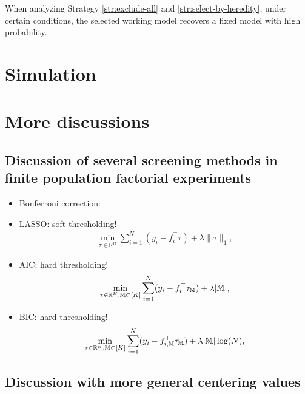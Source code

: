 \documentclass[12pt]{article}
\begin{document}
When analyzing Strategy \ref{str:exclude-all} and \ref{str:select-by-heredity}, under certain conditions, the selected working model recovers a fixed model with high probability. 


\section{Simulation}

\section{More discussions}

\subsection{Discussion of several  screening methods in finite population factorial experiments}
\begin{itemize}
\item Bonferroni correction:

\item LASSO: {\color{red} soft thresholding!}
\begin{align*}
    \min_{\tau \in \mathbb{R}^H}\sum_{i= 1}^N (y_i - f_i^\top \tau) + \lambda \|\tau\|_1,
\end{align*}

\item AIC: {\color{red} hard thresholding!}
\begin{align*}
    \min_{\tau \in \mathbb{R}^H,{\mathbb{M}}\subset [K]}\sum_{i= 1}^N (y_i - f_i^\top \tau_{{\mathbb{M}}}) + \lambda |{\mathbb{M}}|,
\end{align*}

\item BIC: {\color{red} hard thresholding!}
\begin{align*}
    \min_{\tau \in \mathbb{R}^H, {\mathbb{M}}\subset [K]}\sum_{i= 1}^N (y_i - f_{i,{\mathbb{M}}}^\top \tau_{{\mathbb{M}}}) + \lambda |{\mathbb{M}}| \log(N),
\end{align*}
\end{itemize}

\subsection{Discussion with more general centering values}
\end{document}
